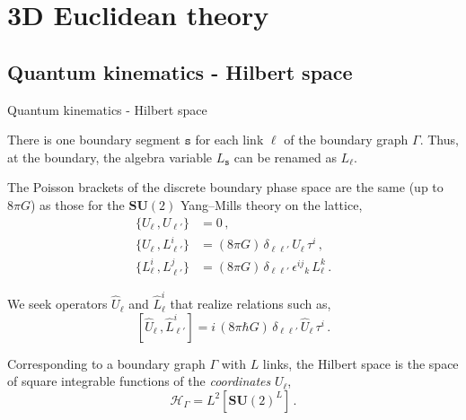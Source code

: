 \documentclass[12pt,titlepage]{article}
\begin{document}
\section{3D Euclidean theory}

\subsection{Quantum kinematics - Hilbert space}

\begin{frame}{Quantum kinematics - Hilbert space}
    \begin{list}{\,}{\leftmargin=1em \itemindent=0em}
        \item<1-> There is one boundary segment $\mathtt{s}$ for each link $\ell$ of the boundary graph $\Gamma$. Thus, at the boundary, the algebra variable $L_\mathtt{s}$ can be renamed as $L_\ell$.
        \item<2-> The Poisson brackets of the discrete boundary phase space are the same (up to $8\pi G$) as those for the $\mathbf{SU}(2)$ Yang–Mills theory on the lattice,
        \begin{align}
            \{U_\ell\,,U_{\ell'}\}&=0\,,\\
            \{U_{\ell}\,,L^i_{\ell'}\}&=(8\pi G)\, \delta_{\ell\ell'}\,U_\ell\,\tau^i\,,\\
            \{L^i_{\ell}\,,L^j_{\ell'}\}&=(8\pi G)\, \delta_{\ell\ell'}\,{\epsilon^{ij}}_k\, L^k_{\ell}\,.
        \end{align}
        \item<3-> We seek operators $\hat{U}_\ell$ and $\hat{L}^i_\ell$ that realize relations such as,
        \begin{equation}\label{3d_comm}
            [\hat{U}_{\ell}\,,\hat{L}^i_{\ell'}]=i\,(8\pi\hbar G)\, \delta_{\ell\ell'}\,\hat{U}_\ell\,\tau^i\,.
        \end{equation}
        \item<4-> Corresponding to a boundary graph $\Gamma$ with $L$ links, the Hilbert space is the space of square integrable functions of the \textit{coordinates} $U_\ell$,
        \begin{equation}
            \mathcal{H}_\Gamma=L^2[{\mathbf{SU}(2)}^L]\,.
        \end{equation}
    \end{list}
\end{frame}
\end{document}
